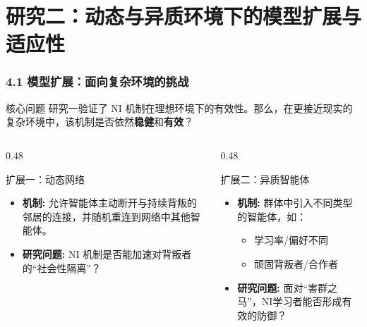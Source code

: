 \documentclass[UTF8]{beamer}
\begin{document}
\section{研究二：动态与异质环境下的模型扩展与适应性}
\begin{frame}
    \frametitle{4.1 模型扩展：面向复杂环境的挑战}
    \begin{block}{核心问题}
        研究一验证了 NI 机制在理想环境下的有效性。那么，在更接近现实的复杂环境中，该机制是否依然\textbf{稳健}和\textbf{有效}？
    \end{block}
    
    \begin{columns}[T]
        \begin{column}{0.48\textwidth}
            \begin{alertblock}{扩展一：动态网络}
                \begin{itemize}
                    \item \textbf{机制:} 允许智能体主动断开与持续背叛的邻居的连接，并随机重连到网络中其他智能体。
                    \item \textbf{研究问题:} NI 机制是否能加速对背叛者的“社会性隔离”？
                \end{itemize}
            \end{alertblock}
        \end{column}
        \begin{column}{0.48\textwidth}
            \begin{alertblock}{扩展二：异质智能体}
                \begin{itemize}
                    \item \textbf{机制:} 群体中引入不同类型的智能体，如：
                    \begin{itemize}
                        \item 学习率/偏好不同
                        \item 顽固背叛者/合作者
                    \end{itemize}
                    \item \textbf{研究问题:} 面对“害群之马”，NI学习者能否形成有效的防御？
                \end{itemize}
            \end{alertblock}
        \end{column}
    \end{columns}
\end{frame}
\end{document}
